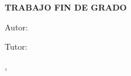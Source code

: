 \begin{titlepage}
  \centering
  \vspace*{1.5cm}

  {\scshape\Large \thesisUniversity\par}
  \vspace{0.3cm}
  {\large \thesisSchool\par}

  \vspace{3.5cm}

  {\Large\bfseries TRABAJO FIN DE GRADO\par}

  \vspace{2.5cm}

  {\huge\bfseries \thesisTitle\par}

  \vfill

  {\large Autor: \thesisAuthor\par}
  \vspace{0.3cm}
  {\large Tutor: \thesisTutor\par}

  \vspace{1.5cm}

  {\large \thesisDegree\par}

  \vfill

  {\large \thesisPlace, \thesisYear\par}

  \vspace{1cm}
\end{titlepage}
